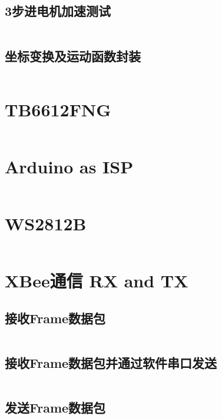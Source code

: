 \subsection{3步进电机加速测试}
\label{sec:Stepper-3}
\inputminted[mathescape, linenos, breaklines]{c}{Code/Stepper-3/Stepper-3.ino}

\subsection{坐标变换及运动函数封装}
\label{sec:Stepper-3-v2}
\inputminted[mathescape, linenos, breaklines]{c}{Code/Stepper-3-v2/Stepper-3-v2.ino}


\section{TB6612FNG}
\label{sec:TB6612FNG-Functionality-Test}
\inputminted[mathescape, linenos, breaklines]{c}{Code/TB6612FNG-Functionality-Test/TB6612FNG-Functionality-Test.ino}

\section{Arduino as ISP}
\label{sec:ArduinoISP}
\inputminted[mathescape, linenos, breaklines]{c}{Code/ArduinoISP/ArduinoISP.ino}

\section{WS2812B}
\label{sec:WS2812B-Functionality-Test}
\inputminted[mathescape, linenos, breaklines]{c}{Code/WS2812B-Functionality-Test/WS2812B-Functionality-Test.ino}


\section{XBee通信 RX and TX}

\subsection{接收Frame数据包}
\label{sec:Series2_Rx}
\inputminted[mathescape, linenos, breaklines]{c}{Code/Series2_Rx/Series2_Rx.ino}

\subsection{接收Frame数据包并通过软件串口发送}
\label{sec:Series2_Rx_Nss}
\inputminted[mathescape, linenos, breaklines]{c}{Code/Series2_Rx_Nss/Series2_Rx_Nss.ino}

\subsection{发送Frame数据包}
\label{sec:Series2_Tx}
\inputminted[mathescape, linenos, breaklines]{c}{Code/Series2_Tx/Series2_Tx.ino}